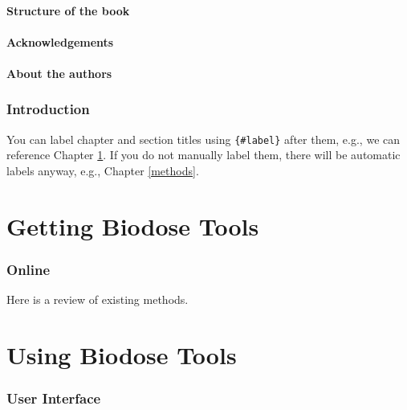 \documentclass[]{scrartcl}
\begin{document}
\hypertarget{structure-of-the-book}{%
\subsection*{Structure of the book}\label{structure-of-the-book}}

\hypertarget{acknowledgements}{%
\subsection*{Acknowledgements}\label{acknowledgements}}

\hypertarget{about-the-authors}{%
\subsection*{About the authors}\label{about-the-authors}}

\hypertarget{intro}{%
\section{Introduction}\label{intro}}

You can label chapter and section titles using \texttt{\{\#label\}} after them, e.g., we can reference Chapter \ref{intro}. If you do not manually label them, there will be automatic labels anyway, e.g., Chapter \ref{methods}.

\hypertarget{part-getting-biodose-tools}{%
\part{Getting Biodose Tools}\label{part-getting-biodose-tools}}

\hypertarget{online}{%
\section{Online}\label{online}}

Here is a review of existing methods.

\hypertarget{part-using-biodose-tools}{%
\part{Using Biodose Tools}\label{part-using-biodose-tools}}

\hypertarget{user-interface}{%
\section{User Interface}\label{user-interface}}
\end{document}
